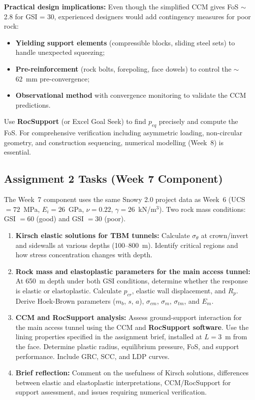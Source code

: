 \documentclass[a4paper,12pt]{article}
\begin{document}
\begin{warnbox}[GSI = 30 — solving the GRC--SCC intersection]
\textbf{Practical design implications:} Even though the simplified CCM gives FoS $\sim$2.8 for GSI = 30, experienced designers would add contingency measures for poor rock:
\begin{itemize}[nosep]
    \item \textbf{Yielding support elements} (compressible blocks, sliding steel sets) to handle unexpected squeezing;
    \item \textbf{Pre-reinforcement} (rock bolts, forepoling, face dowels) to control the $\sim$62~mm pre-convergence;
    \item \textbf{Observational method} with convergence monitoring to validate the CCM predictions.
\end{itemize}
Use \textbf{RocSupport} (or Excel Goal Seek) to find $p_{eq}$ precisely and compute the FoS. For comprehensive verification including asymmetric loading, non-circular geometry, and construction sequencing, numerical modelling (Week~8) is essential.
\end{warnbox}

\subsection{Assignment 2 Tasks (Week 7 Component)}
The Week~7 component uses the same Snowy 2.0 project data as Week~6 (UCS $= 72$~MPa, $E_i = 26$~GPa, $\nu = 0.22$, $\gamma = 26$~kN/m$^3$). Two rock mass conditions: GSI $= 60$ (good) and GSI $= 30$ (poor).

\begin{enumerate}
    \item \textbf{Kirsch elastic solutions for TBM tunnels:} Calculate $\sigma_\theta$ at crown/invert and sidewalls at various depths (100--800~m). Identify critical regions and how stress concentration changes with depth.

    \item \textbf{Rock mass and elastoplastic parameters for the main access tunnel:} At 650~m depth under both GSI conditions, determine whether the response is elastic or elastoplastic. Calculate $p_{cr}$, elastic wall displacement, and $R_p$. Derive Hoek-Brown parameters ($m_b$, $s$, $a$), $\sigma_{cm}$, $\sigma_m$, $\sigma_{tm}$, and $E_m$.

    \item \textbf{CCM and RocSupport analysis:} Assess ground-support interaction for the main access tunnel using the CCM and \textbf{RocSupport software}. Use the lining properties specified in the assignment brief, installed at $L = 3$~m from the face. Determine plastic radius, equilibrium pressure, FoS, and support performance. Include GRC, SCC, and LDP curves.

    \item \textbf{Brief reflection:} Comment on the usefulness of Kirsch solutions, differences between elastic and elastoplastic interpretations, CCM/RocSupport for support assessment, and issues requiring numerical verification.
\end{enumerate}
\end{document}
